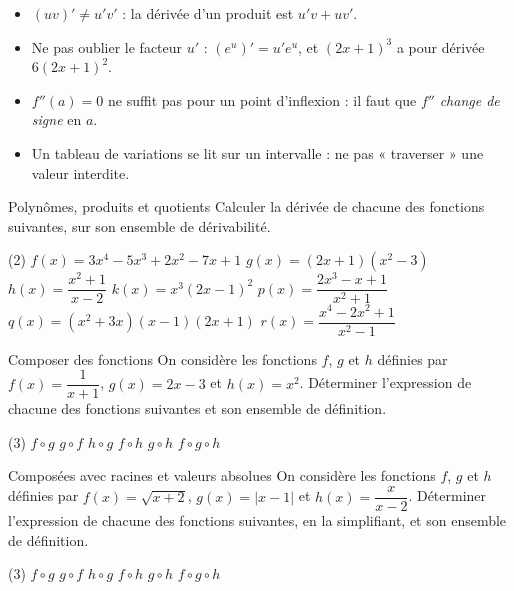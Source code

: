 \begin{attention}
\begin{itemize}[label={\color{otOrange}\textbullet},leftmargin=1.4em,itemsep=0.6mm,topsep=0.5mm]
  \item $(uv)'\neq u'v'$ : la dérivée d'un produit est $u'v+uv'$.
  \item Ne pas oublier le facteur $u'$ : $\left(e^{u}\right)'=u'e^{u}$, et $(2x+1)^{3}$ a pour dérivée $6(2x+1)^{2}$.
  \item $f''(a)=0$ ne suffit pas pour un point d'inflexion : il faut que $f''$ \emph{change de signe} en $a$.
  \item Un tableau de variations se lit sur un intervalle : ne pas « traverser » une valeur interdite.
\end{itemize}
\end{attention}

\exercices
{}

\begin{exercice}[1]{Polynômes, produits et quotients}
Calculer la dérivée de chacune des fonctions suivantes, sur son ensemble de dérivabilité.
\begin{tasks}(2)
  \task $f(x)=3x^{4}-5x^{3}+2x^{2}-7x+1$
  \task $g(x)=(2x+1)\left(x^{2}-3\right)$
  \task $h(x)=\dfrac{x^{2}+1}{x-2}$
  \task $k(x)=x^{3}(2x-1)^{2}$
  \task $p(x)=\dfrac{2x^{3}-x+1}{x^{2}+1}$
  \task $q(x)=\left(x^{2}+3x\right)(x-1)(2x+1)$
  \task $r(x)=\dfrac{x^{4}-2x^{2}+1}{x^{2}-1}$
\end{tasks}
\end{exercice}

\begin{exercice}[1]{Composer des fonctions}
On considère les fonctions $f$, $g$ et $h$ définies par $f(x)=\dfrac{1}{x+1}$, $g(x)=2x-3$ et $h(x)=x^{2}$.
Déterminer l'expression de chacune des fonctions suivantes et son ensemble de définition.
\begin{tasks}(3)
  \task $f\circ g$
  \task $g\circ f$
  \task $h\circ g$
  \task $f\circ h$
  \task $g\circ h$
  \task $f\circ g\circ h$
\end{tasks}
\end{exercice}


\begin{exercice}[2]{Composées avec racines et valeurs absolues}
On considère les fonctions $f$, $g$ et $h$ définies par $f(x)=\sqrt{x+2}$, $g(x)=|x-1|$ et $h(x)=\dfrac{x}{x-2}$.
Déterminer l'expression de chacune des fonctions suivantes, en la simplifiant, et son ensemble de définition.
\begin{tasks}(3)
  \task $f\circ g$
  \task $g\circ f$
  \task $h\circ g$
  \task $f\circ h$
  \task $g\circ h$
  \task $f\circ g\circ h$
\end{tasks}
\end{exercice}

